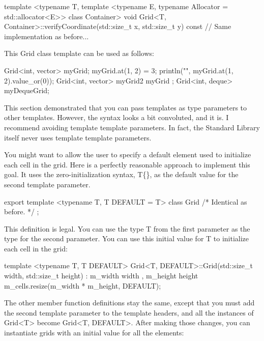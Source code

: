\begin{cpp}
template <typename T,
    template <typename E, typename Allocator = std::allocator<E>> class Container>
void Grid<T, Container>::verifyCoordinate(std::size_t x, std::size_t y) const
{
    // Same implementation as before...
}
\end{cpp}

This Grid class template can be used as follows:

\begin{cpp}
Grid<int, vector> myGrid;
myGrid.at(1, 2) = 3;
println("{}", myGrid.at(1, 2).value_or(0));
Grid<int, vector> myGrid2 { myGrid };
Grid<int, deque> myDequeGrid;
\end{cpp}

This section demonstrated that you can pass templates as type parameters to other templates. However, the syntax looks a bit convoluted, and it is. I recommend avoiding template template parameters. In fact, the Standard Library itself never uses template template parameters.



You might want to allow the user to specify a default element used to initialize each cell in the grid. Here is a perfectly reasonable approach to implement this goal. It uses the zero-initialization syntax, T\{\}, as the default value for the second template parameter.

\begin{cpp}
export template <typename T, T DEFAULT = T{}>
class Grid { /* Identical as before. */ };
\end{cpp}

This definition is legal. You can use the type T from the first parameter as the type for the second parameter. You can use this initial value for T to initialize each cell in the grid:

\begin{cpp}
template <typename T, T DEFAULT>
Grid<T, DEFAULT>::Grid(std::size_t width, std::size_t height)
    : m_width { width }, m_height { height }
{
    m_cells.resize(m_width * m_height, DEFAULT);
}
\end{cpp}

The other member function definitions stay the same, except that you must add the second template parameter to the template headers, and all the instances of Grid<T> become Grid<T, DEFAULT>. After making those changes, you can instantiate grids with an initial value for all the elements:

